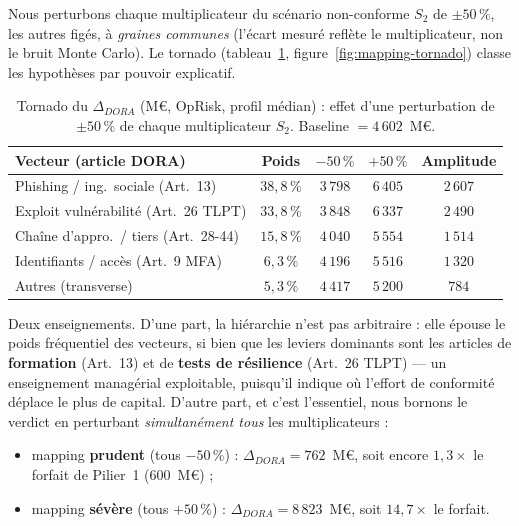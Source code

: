 \documentclass[11pt,a4paper]{article}
\theoremstyle{navystyle}
\theoremstyle{navydef}
\begin{document}
Nous perturbons chaque multiplicateur du scénario non-conforme $S_2$ de $\pm50\,\%$, les autres figés, à \emph{graines communes} (l'écart mesuré reflète le multiplicateur, non le bruit Monte Carlo). Le tornado (tableau~\ref{tab:mapping}, figure~\ref{fig:mapping-tornado}) classe les hypothèses par pouvoir explicatif.

\begin{table}[h]
\centering
\setlength{\tabcolsep}{6pt}
\renewcommand{\arraystretch}{1.2}
\begin{tabular}{>{\raggedright}p{5.2cm} c c c c}
\toprule
\rowcolor{lightblue}
\textbf{Vecteur (article DORA)} & \textbf{Poids} & \textbf{$-50\,\%$} & \textbf{$+50\,\%$} & \textbf{Amplitude} \\
\midrule
Phishing / ing.\ sociale (Art.~13) & $38{,}8\,\%$ & $3\,798$ & $6\,405$ & $2\,607$ \\
Exploit vulnérabilité (Art.~26 TLPT) & $33{,}8\,\%$ & $3\,848$ & $6\,337$ & $2\,490$ \\
Chaîne d'appro.\ / tiers (Art.~28-44) & $15{,}8\,\%$ & $4\,040$ & $5\,554$ & $1\,514$ \\
Identifiants / accès (Art.~9 MFA) & $6{,}3\,\%$ & $4\,196$ & $5\,516$ & $1\,320$ \\
Autres (transverse) & $5{,}3\,\%$ & $4\,417$ & $5\,200$ & $784$ \\
\bottomrule
\end{tabular}
\caption{Tornado du $\Delta_{DORA}$ (M\euro, OpRisk, profil médian) : effet d'une perturbation de $\pm50\,\%$ de chaque multiplicateur $S_2$. Baseline $=4\,602$~M\euro.}
\label{tab:mapping}
\end{table}

Deux enseignements. D'une part, la hiérarchie n'est pas arbitraire : elle épouse le poids fréquentiel des vecteurs, si bien que les leviers dominants sont les articles de \textbf{formation} (Art.~13) et de \textbf{tests de résilience} (Art.~26 TLPT) --- un enseignement managérial exploitable, puisqu'il indique où l'effort de conformité déplace le plus de capital. D'autre part, et c'est l'essentiel, nous bornons le verdict en perturbant \emph{simultanément tous} les multiplicateurs :
\begin{itemize}[leftmargin=1.5em,itemsep=1pt]
\item mapping \textbf{prudent} (tous $-50\,\%$) : $\Delta_{DORA}=762$~M\euro, soit encore $1{,}3\times$ le forfait de Pilier~1 ($600$~M\euro) ;
\item mapping \textbf{sévère} (tous $+50\,\%$) : $\Delta_{DORA}=8\,823$~M\euro, soit $14{,}7\times$ le forfait.
\end{itemize}
\end{document}
